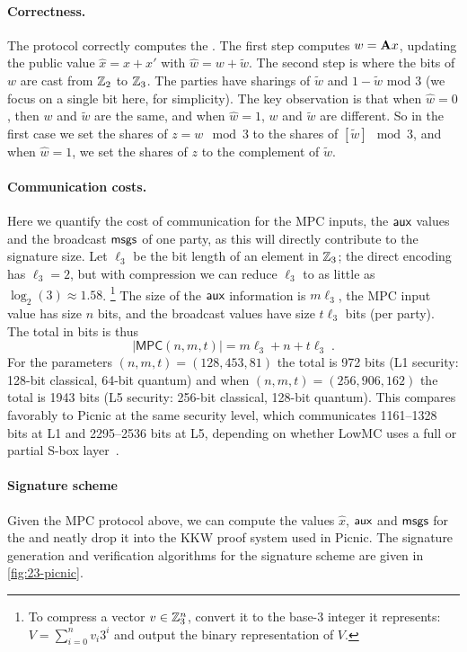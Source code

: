 \paragraph{Correctness.} The protocol correctly computes the \ttOWF.  The
first step computes $w = \mathbf{A} x$, 
updating the public value $\hat{x} = x + x'$ with $\hat{w} = w + \tilde{w}$.  The
second step is where the bits of $w$ are cast from $\mathbb{Z}_2$ to $\mathbb{Z}_3$.  The 
parties have sharings of $\tilde{w}$ and $1-\tilde{w}$ mod 3 (we focus on a single bit here, for simplicity). The key observation is
that when $\hat{w} = 0$, then $w$ and $\tilde{w}$ are the same, and when $\hat{w} =
1$, $w$ and $\tilde{w}$ are different. So in the first case we set the shares of $ z =
w \mod 3$ to the shares of $[\tilde{w}] \mod 3$, and when $\hat{w} = 1$, we set the
shares of $z$ to the complement of $\tilde{w}$.

\paragraph{Communication costs.}
Here we quantify the cost of communication for the MPC inputs, the $\textsf{aux}$ values and the broadcast $\textsf{msgs}$ of one party,
as this will directly contribute to the signature size. 
Let $\ell_3$ be the bit length of an element in $\mathbb{Z}_3$; the direct encoding has
$\ell_3 = 2$, but with compression we can reduce $\ell_3$ to as little as
$\log_2(3) \approx 1.58$. \footnote{To compress a vector $v\in\mathbb{Z}_3^{n}$, convert it to the base-3 integer it represents: $V = \sum_{i=0}^n v_i3^i$
and output the binary representation of $V$. }   The size of the
$\textsf{aux}$ information is $m\ell_3$, the MPC input value has size $n$ bits, 
and the broadcast values have size $t\ell_3$ bits (per party). 
The total in bits is thus 
\begin{equation} \label{eqn:sizeMPC}
|\textsf{MPC}(n,m,t)| = m\ell_3 + n + t\ell_3\;.
\end{equation}
For the parameters 
$(n,m,t)=(128, 453, 81)$ the total is 972 bits (L1 security: 128-bit classical, 64-bit quantum)
and when $(n,m,t) = (256, 906, 162)$ the total is 1943 bits (L5 security: 256-bit classical, 128-bit quantum).  This compares favorably to
Picnic at the same security level, which communicates 1161--1328 bits at L1
and 2295--2536 bits at L5, depending on whether LowMC uses a full or partial S-box layer~\cite{kales2020-picnic}.

\paragraph{Signature scheme}
Given the MPC protocol above, we can compute the values $\hat{x}$, $\textsf{aux}$ and
$\textsf{msgs}$ for the \ttOWF and neatly drop it into the KKW proof system used in
Picnic.  The signature generation and verification algorithms for the
\ttOWF  signature scheme are given in \cref{fig:23-picnic}.


